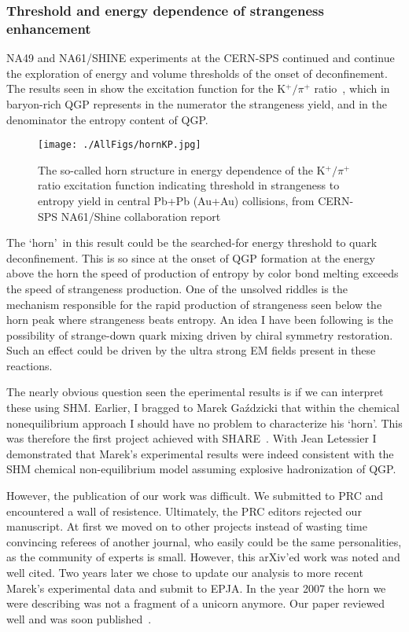 \subsubsection{Threshold and energy dependence of strangeness enhancement}

NA49 and NA61/SHINE experiments at the CERN-SPS continued and continue the exploration of energy and volume thresholds of the onset of deconfinement. The results seen in  show the excitation function for the K$^+/\pi^+$ ratio~\cite{NA61Shine}, which in baryon-rich QGP represents in the numerator the strangeness yield, and in the denominator the entropy content of QGP. 

\begin{figure}[tb]\sidecaption
\centering
\texttt{[image: ./AllFigs/hornKP.jpg]}
\caption{The so-called horn structure in energy dependence of the K$^+/\pi^+$ ratio excitation function indicating threshold in strangeness to entropy yield in central Pb+Pb (Au+Au) collisions, from CERN-SPS NA61/Shine collaboration report~\cite{NA61Shine}
}
\label{fig:onset}
\end{figure}

The \lq horn\rq\ in this result could be the searched-for energy threshold to quark deconfinement. This is so since at the onset of QGP formation at the energy above the horn the speed of production of entropy by color bond melting exceeds the speed of strangeness production. One of the unsolved riddles is the mechanism responsible for the rapid production of strangeness seen below the horn peak where strangeness beats entropy. An idea I have been following is the possibility of strange-down quark mixing driven by chiral symmetry restoration. Such an effect could be driven by the ultra strong EM fields present in these reactions.

The nearly obvious question seen the eperimental results is if we can interpret these using SHM. Earlier, I bragged to Marek Ga\'zdzicki that within the chemical nonequilibrium approach I should have no problem to characterize his \lq horn\rq. This was therefore the first project achieved with SHARE~\cite{Letessier:2005qe}. With Jean Letessier I demonstrated that Marek\rq s experimental results were indeed consistent with the SHM chemical non-equilibrium model assuming explosive hadronization of QGP. 

However, the publication of our work was difficult. We submitted to PRC and encountered a wall of resistence. Ultimately, the PRC editors rejected our manuscript. At first we moved on to other projects instead of wasting time convincing referees of another journal, who easily could be the same personalities, as the community of experts is small. However, this arXiv\rq ed work was noted and well cited. Two years later we chose to update our analysis to more recent Marek\rq s experimental data and submit to EPJA. In the year 2007 the horn we were describing was not  a fragment of a unicorn anymore. Our paper reviewed well and was soon published~\cite{Letessier:2005qe}. 

